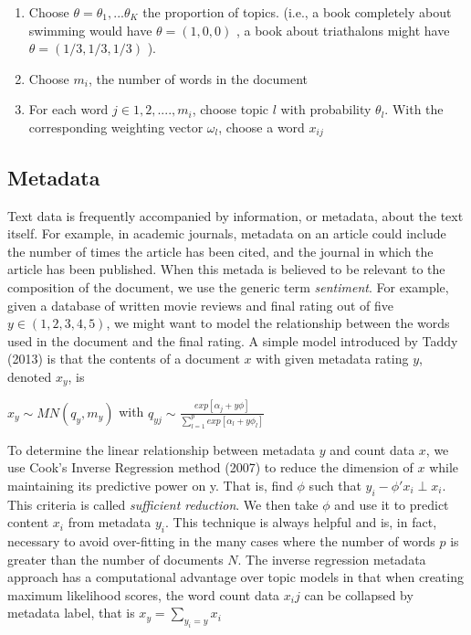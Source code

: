 \documentclass[12pt]{article}
\begin{document}
\begin{enumerate}
\def\labelenumi{\arabic{enumi}.}
\itemsep1pt\parskip0pt
\item
  Choose $\theta = \theta_1,...\theta_K$ the proportion of topics.
  (i.e., a book completely about swimming would have $\theta=(1,0,0)$ ,
  a book about triathalons might have $\theta =(1/3,1/3,1/3)$ ).
\item
  Choose $m_i$, the number of words in the document
\item
  For each word $j \in 1,2,....,m_i$, choose topic $l$ with probability
  $\theta_l$. With the corresponding weighting vector $\omega_l$, choose
  a word $x_{ij}$
\end{enumerate}

\subsection{Metadata}\label{metadata}

Text data is frequently accompanied by information, or metadata, about
the text itself. For example, in academic journals, metadata on an
article could include the number of times the article has been cited,
and the journal in which the article has been published. When this
metada is believed to be relevant to the composition of the document, we
use the generic term \emph{sentiment}. For example, given a database of
written movie reviews and final rating out of five $y \in (1,2,3,4,5)$,
we might want to model the relationship between the words used in the
document and the final rating. A simple model introduced by Taddy (2013)
is that the contents of a document $x$ with given metadata rating $y$,
denoted $x_y$, is

$x_y \sim MN(q_y,m_y)$ with
$q_{yj} \sim \frac{exp[\alpha_j + y \phi]}{\sum_{l=1}^{p} exp[\alpha_l + y \phi_l]}$

To determine the linear relationship between metadata $y$ and count data
$x$, we use Cook's Inverse Regression method (2007) to reduce the
dimension of $x$ while maintaining its predictive power on y. That is,
find $\phi$ such that $y_i - \phi' x_i \perp x_i$. This criteria is
called \emph{sufficient reduction}. We then take $\phi$ and use it to
predict content $x_i$ from metadata $y_i$. This technique is always
helpful and is, in fact, necessary to avoid over-fitting in the many
cases where the number of words $p$ is greater than the number of
documents $N$. The inverse regression metadata approach has a
computational advantage over topic models in that when creating maximum
likelihood scores, the word count data $x_ij$ can be collapsed by
metadata label, that is $x_y = \sum_{y_{i} = y}{x_i}$
\end{document}
